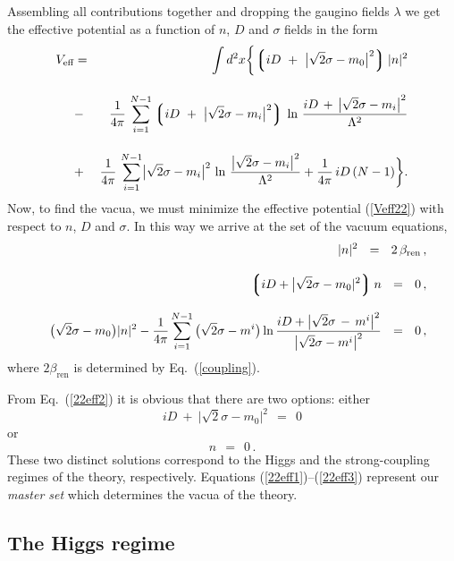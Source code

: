 \documentclass[epsfig,12pt]{article}
\def\beq{\begin{equation}}
\def\eeq{\end{equation}}
\def\beqn{\begin{eqnarray}}
\def\eeqn{\end{eqnarray}}
\def\beqn{\begin{eqnarray}}
\def\eeqn{\end{eqnarray}}
\def\beq{\begin{equation}}
\def\eeq{\end{equation}}
\newcommand{\lgr}{\left\lgroup}
\newcommand{\rgr}{\right\rgroup}
\newcommand{\bren}{{\beta_\text{ren}}}
\begin{document}
\vspace{2mm}

Assembling  all contributions together and dropping 
the gaugino fields $\lambda$ we get the effective potential as 
a function of $n$, $D$ and $\sigma$ fields  in
the form
\beqn
	V_\text{eff} & =& \int d^2x 
		\biggl\{  \lgr iD ~+~ \bigl|\sqrt{2}\sigma - m_0\bigr|^2 \rgr |n|^2 
	\nonumber\\[4mm]
	&-& 
	\frac{1}{4\pi}\, \sum_{i=1}^{N-1} \lgr iD ~+~ \bigl|\sqrt{2}\sigma - {m_i}\bigr|^2 \rgr\,
		\ln\, \frac{ iD \,+\, \left| \sqrt{2}\sigma - m_i \right|^2} {\Lambda^2}
\nonumber\\[4mm]
	&+& 
	\frac{1}{4\pi}\, \sum_{i=1}^{N-1} \bigl| \sqrt{2}\sigma - m_i\bigr|^2\,
			\ln\, \frac{ \bigl| \sqrt{2}\sigma -  m_i \bigr|^2 }{ \Lambda^2 }
	+
	\frac{1}{4\pi}\, iD\, (N-1)  \biggr \}  .
	\nonumber\\
	\label{Veff22}
\eeqn
Now, to find the vacua, we must minimize the 
effective potential (\ref{Veff22}) with respect to $n$, $D$ and $ \sigma $. In this way we  arrive at
the set of	the vacuum equations,
\beqn
\label{22eff1}
	&&
	|n|^2  ~~=~~ 2\,\bren\,, 
\\[3mm]				
	&&
	\lgr i D + \bigl|\sqrt{2}\sigma - m_0 |^2 \rgr n ~~=~~ 0\,, 
	\label{22eff2}
	\\[3mm]
	&&
	\bigl(\sqrt{2}\sigma - m_0 \bigr)|n|^2 
		-
	\frac{1}{4\pi} \sum_{i=1}^{N-1}\,
			\bigl(\sqrt{2}\sigma - m^i\bigr)\,
		{\rm ln}\, 
		\frac{i D + \bigl| \sqrt{2}\sigma \,-\, m^i \bigr|^2}
		{\bigl| \sqrt{2}\sigma - m^i \bigr|^2}
		 ~~=~~ 0\,,
\label{22eff3}
\nonumber\\
\eeqn
where $2\bren$ is determined by Eq.~(\ref{coupling}).

From Eq.~(\ref{22eff2}) it is obvious that there are two options: either
\beq
\label{higgsph22}
	 iD ~+~ \bigl| \sqrt{2}\sigma - m_0 \bigr|^2 ~~=~~ 0  
\eeq
or
\beq
\label{strongph22}
	 n ~~=~~ 0 \,. 
\eeq
	These two distinct solutions correspond to the Higgs and the strong-coupling regimes of the theory, respectively. 
	Equations (\ref{22eff1})--(\ref{22eff3}) represent our {\em master set} which
determines the vacua of the theory. 

\subsection{The Higgs regime}
\label{hireg}
\end{document}
